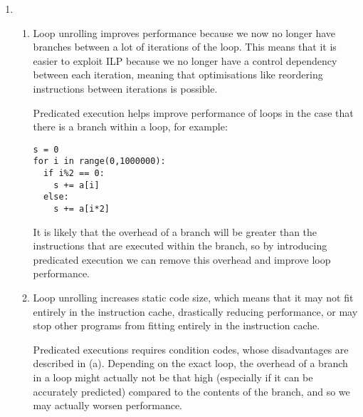 \begin{enumerate}[label=(\alph*)]
\item
  \begin{enumerate}[label=(\roman*)]

    \item
      Loop unrolling improves performance because we now no longer have branches between a lot of iterations of the loop. This means that it is easier to exploit ILP because we no longer have a control dependency between each iteration, meaning that optimisations like reordering instructions between iterations is possible.

      Predicated execution helps improve performance of loops in the case that there is a branch within a loop, for example:

\begin{verbatim}
s = 0
for i in range(0,1000000):
  if i%2 == 0:
    s += a[i]
  else:
    s += a[i*2]
\end{verbatim}

It is likely that the overhead of a branch will be greater than the instructions that are executed within the branch, so by introducing predicated execution we can remove this overhead and improve loop performance.

\item
  Loop unrolling increases static code size, which means that it may not fit entirely in the instruction cache, drastically reducing performance, or may stop other programs from fitting entirely in the instruction cache.

  Predicated executions requires condition codes, whose disadvantages are described in (a). Depending on the exact loop, the overhead of a branch in a loop might actually not be that high (especially if it can be accurately predicted) compared to the contents of the branch, and so we may actually worsen performance.

     
      
  \end{enumerate}
        
\end{enumerate}

